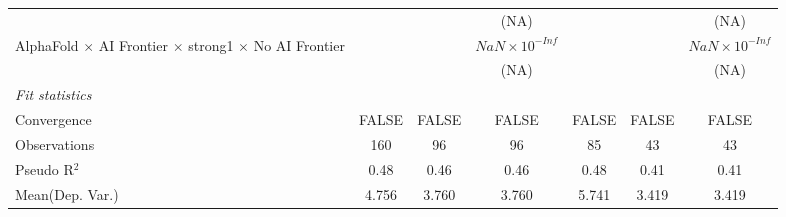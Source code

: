 \begin{tabular}{lcccccc}
                                                                              &                        &                        & (NA)                   &                        &                        & (NA)\\   
   AlphaFold $\times$ AI Frontier $\times$ strong1 $\times$ No AI Frontier    &                        &                        & $NaN\times 10^{-Inf}$  &                        &                        & $NaN\times 10^{-Inf}$\\    
                                                                              &                        &                        & (NA)                   &                        &                        & (NA)\\   
   \midrule
   \emph{Fit statistics}\\
   Convergence                                                                &FALSE                   & FALSE                  & FALSE                  & FALSE                  & FALSE                  & FALSE\\  
   Observations                                                               & 160                    & 96                     & 96                     & 85                     & 43                     & 43\\  
   Pseudo R$^2$                                                               & 0.48                   & 0.46                   & 0.46                   & 0.48                   & 0.41                   & 0.41\\  
Mean(Dep. Var.) & 4.756 & 3.760 & 3.760 & 5.741 & 3.419 & 3.419 \\
   

\end{tabular}
